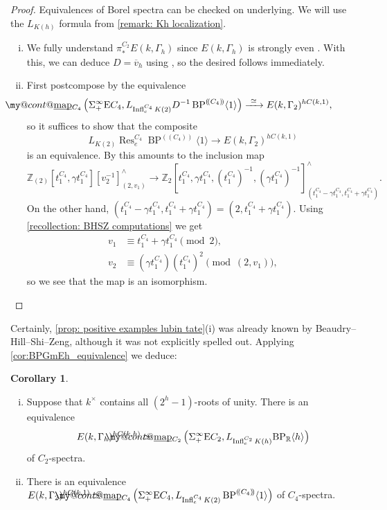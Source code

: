 \documentclass[a4paper, 10pt]{article}
\makeatletter
\newcommand{\Z}{\mathbb{Z}}
\newcommand{\BP}{\operatorname{BP}}
\newcommand{\BPR}{{\BP_{\mathbb{R}}}}
\newcommand{\Res}{\operatorname{Res}}
\newcommand{\map}{\operatorname{map}}
\newcommand{\Infl}{\operatorname{Infl}}
\DeclareRobustCommand{\myuline}[2][0pt]{%
  \ifmmode
    \uline{\hphantom{#2}\kern-#1}%
    \kern#1%
    \mathllap{\mathpalette\my@cont@{#2}}%
  \else
    \uline{\phantom{#2}\kern-#1}%
    \kern#1%
    \llap{\contour{white}{#2}}%
  \fi
}
\newcommand{\ul}{\myuline}
\newcommand{\ol}{\overline}
\newcommand{\my@cont@}[2]{\contour{white}{\mbox{$\m@th#1#2$}}}
\theoremstyle{definition}
\newtheorem{corollary}[corollary]{Corollary}
\makeatother
\begin{document}
\begin{proof}
    Equivalences of Borel spectra can be checked on underlying. We will use the $L_{K(h)}$ formula from \cref{remark: Kh localization}.
    \begin{enumerate}[(i)]
        \item We fully understand $\pi_*^{C_2} E(k,\Gamma_h)$ since $E(k, \Gamma_h)$ is strongly even \cite[Theorem 1.9]{hahnRealOrientationsLubin2020}. With this, we can deduce $D = \ol{v}_h$ using \cite[Proposition 6.3]{beaudryHillShiZeng2021modelsLubinTate}, so the desired follows immediately.
        \item First postcompose by the equivalence 
        \[ \ul{\map}_{C_4}\left(\Sigma_+^{\infty} \mathrm{E}C_4, L_{\Infl_e^{C_4} K(2)} D^{-1}\BP^{( \! ( C_4 ) \! )} \langle 1 \rangle \right) \xrightarrow{\ \simeq \ } E(k,\Gamma_2)^{hC(k,1)}, \]
        so it suffices to show that the composite 
        \[ L_{K(2)} \Res_e^{C_4} \BP^{( \! ( C_4 ) \! )} \langle 1 \rangle \longrightarrow E(k,\Gamma_2)^{hC(k,1)} \]
        is an equivalence. By \cite[Proposition 5.4]{beaudryHillShiZeng2021modelsLubinTate} this amounts to the inclusion map
        \[ \Z_{(2)} \left[t_1^{C_4}, \gamma t_1^{C_4} \right][v_2^{-1}]_{(2,v_1)}^{\wedge} \longrightarrow \Z_{2} \left[t_1^{C_4}, \gamma t_1^{C_4}, (t_1^{C_4})^{-1}, (\gamma t_1^{C_4})^{-1} \right]_{(t_1^{C_4} - \gamma t_1^{C_4}, t_1^{C_4} + \gamma t_1^{C_4})}^{\wedge}. \]
        On the other hand, $(t_1^{C_4} - \gamma t_1^{C_4}, t_1^{C_4} + \gamma t_1^{C_4}) = (2, t_1^{C_4}+\gamma t_1^{C_4})$. Using \cref{recollection: BHSZ computations} we get
        \begin{align*}
            v_1 &\equiv t_1^{C_4} + \gamma t_1^{C_4} \pmod 2,
            \\ v_2 &\equiv (\gamma t_1^{C_4})(t_1^{C_4})^{2} \pmod{(2,v_1)},
        \end{align*}
        so we see that the map is an isomorphism. \qedhere
    \end{enumerate}
\end{proof}

Certainly, \cref{prop: positive examples lubin tate}(i) was already known by Beaudry--Hill--Shi--Zeng, although it was not explicitly spelled out. Applying \cref{cor:BPGmEh_equivalence} we deduce:

\begin{corollary}
    \hfill 
    \begin{enumerate}[(i)]
        \item Suppose that $k^{\times}$ contains all $(2^h-1)$-roots of unity. There is an equivalence 
        \[ E(k,\Gamma_h)^{hC(k,h)} \simeq \ul{\map}_{C_2}\left(\Sigma_+^{\infty} \mathrm{E}C_2, L_{\Infl_e^{C_2}K(h)} \BPR\langle h \rangle \right) \] 
        of $C_2$-spectra.
        \item There is an equivalence $E(k, \Gamma_2)^{hC(k,1)} \simeq \ul{\map}_{C_4}\left(\Sigma_+^{\infty} \mathrm{E}C_4, L_{\Infl_e^{C_4} K(2)} \BP^{( \! ( C_4 ) \! )} \langle 1 \rangle \right)$ 
    of $C_4$-spectra.
    \end{enumerate}
\end{corollary}
\end{document}
